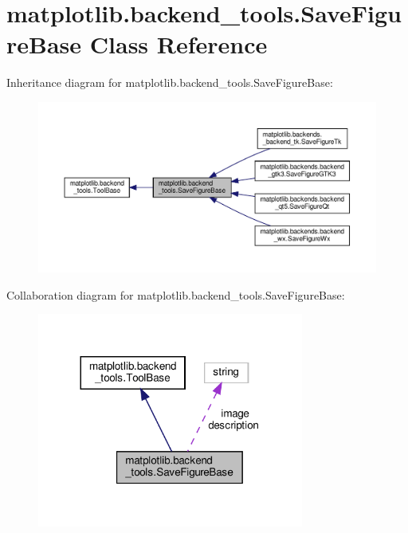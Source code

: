\hypertarget{classmatplotlib_1_1backend__tools_1_1SaveFigureBase}{}\section{matplotlib.\+backend\+\_\+tools.\+Save\+Figure\+Base Class Reference}
\label{classmatplotlib_1_1backend__tools_1_1SaveFigureBase}


Inheritance diagram for matplotlib.\+backend\+\_\+tools.\+Save\+Figure\+Base\+:
\nopagebreak
\begin{figure}[H]
\begin{center}
\leavevmode
\includegraphics[width=350pt]{classmatplotlib_1_1backend__tools_1_1SaveFigureBase__inherit__graph}
\end{center}
\end{figure}


Collaboration diagram for matplotlib.\+backend\+\_\+tools.\+Save\+Figure\+Base\+:
\nopagebreak
\begin{figure}[H]
\begin{center}
\leavevmode
\includegraphics[width=248pt]{classmatplotlib_1_1backend__tools_1_1SaveFigureBase__coll__graph}
\end{center}
\end{figure}
